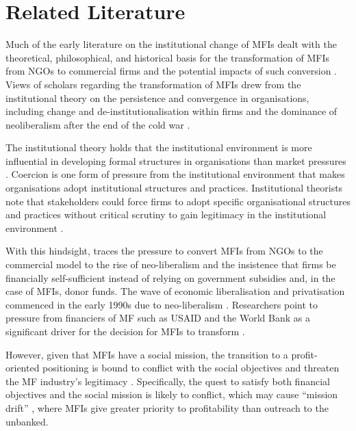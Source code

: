 \documentclass[a4paper,nobind]{templates/ociamthesis}
\begin{document}
\hypertarget{related-literature}{%
\chapter{Related Literature}\label{related-literature}}

Much of the early literature on the institutional change of MFIs dealt with the theoretical, philosophical, and historical basis for the transformation of MFIs from NGOs to commercial firms and the potential impacts of such conversion \autocite{campion1999institutional,christen2001commercialization,gutierrez201920,zaby2019science}. Views of scholars regarding the transformation of MFIs drew from the institutional theory on the persistence and convergence in organisations, including change and de-institutionalisation within firms \autocite{scott2004institutional} and the dominance of neoliberalism after the end of the cold war \autocite{ostry2017}.

The institutional theory holds that the institutional environment is more influential in developing formal structures in organisations than market pressures \autocite{maggio1991}. Coercion is one form of pressure from the institutional environment that makes organisations adopt institutional structures and practices. Institutional theorists note that stakeholders could force firms to adopt specific organisational structures and practices without critical scrutiny to gain legitimacy in the institutional environment \autocite{scott2004institutional,martinez2017coercive}.

With this hindsight, \textcite{bateman2010doesn} traces the pressure to convert MFIs from NGOs to the commercial model to the rise of neo-liberalism and the insistence that firms be financially self-sufficient instead of relying on government subsidies and, in the case of MFIs, donor funds. The wave of economic liberalisation and privatisation commenced in the early 1990s due to neo-liberalism \autocite{silva1998neoliberalism}. Researchers point to pressure from financiers of MF such as USAID and the World Bank as a significant driver for the decision for MFIs to transform \autocite{ostry2017}.

However, given that MFIs have a social mission, the transition to a profit-oriented positioning is bound to conflict with the social objectives and threaten the MF industry's legitimacy \autocite{ramus2017,nason2018behavioral}. Specifically, the quest to satisfy both financial objectives and the social mission is likely to conflict, which may cause ``mission drift'' \autocite{mersland2010microfinance,mia2017mission}, where MFIs give greater priority to profitability than outreach to the unbanked.
\end{document}
